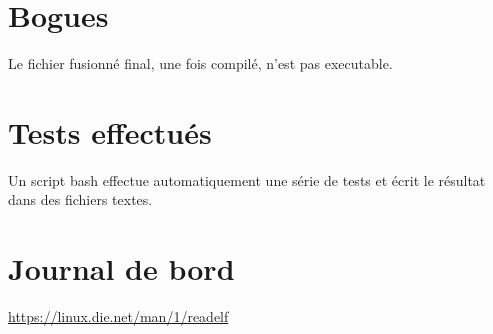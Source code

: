 \documentclass[10pt,twoside]{article}   %
\begin{document}
\section{Bogues}
	Le fichier fusionné final, une fois compilé, n'est pas executable.


\section{Tests effectués}
	Un script bash effectue automatiquement une série de tests et écrit le résultat dans des fichiers textes.

\section{Journal de bord}


\begin{thebibliography}{9}

\url{https://linux.die.net/man/1/readelf}


\end{thebibliography}
\end{document}

